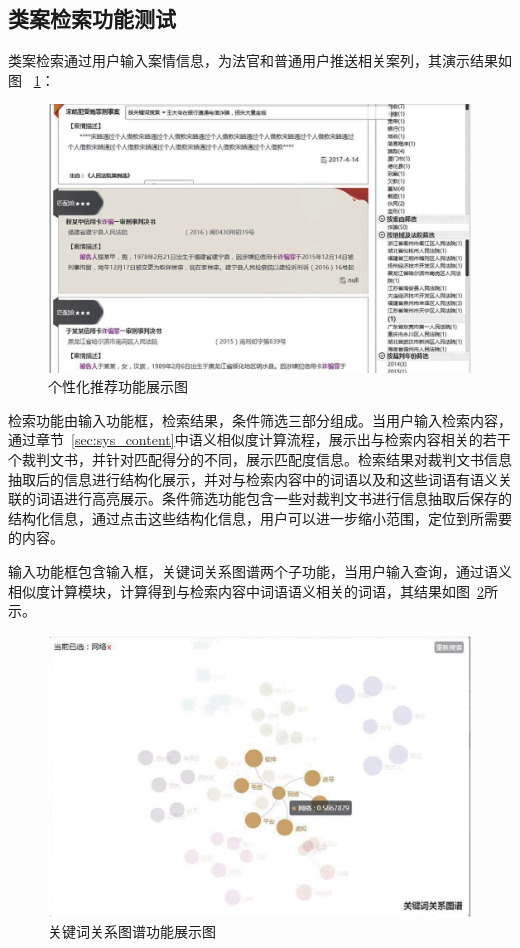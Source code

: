 \subsection{类案检索功能测试}
类案检索通过用户输入案情信息，为法官和普通用户推送相关案列，其演示结果如图
~\ref{fig:sys_search}：
\begin{figure}[htbp]%
    \centering
    \includegraphics[scale=0.3, clip=true]{./sources/sys_search.eps}
    \caption{\label{fig:sys_search}个性化推荐功能展示图}
\end{figure}

检索功能由输入功能框，检索结果，条件筛选三部分组成。当用户输入检索内容，通过章节~\ref{sec:sys_content}中语义相似度计算流程，展示出与检索内容相关的若干个裁判文书，并针对匹配得分的不同，展示匹配度信息。检索结果对裁判文书信息抽取后的信息进行结构化展示，并对与检索内容中的词语以及和这些词语有语义关联的词语进行高亮展示。条件筛选功能包含一些对裁判文书进行信息抽取后保存的结构化信息，通过点击这些结构化信息，用户可以进一步缩小范围，定位到所需要的内容。

输入功能框包含输入框，关键词关系图谱两个子功能，当用户输入查询，通过语义相似度计算模块，计算得到与检索内容中词语语义相关的词语，其结果如图~\ref{fig:sys_word}所示。
\begin{figure}[htbp]%
    \centering
    \includegraphics[scale=0.35, clip=true]{./sources/sys_word.eps}
    \caption{\label{fig:sys_word}关键词关系图谱功能展示图}
\end{figure}

